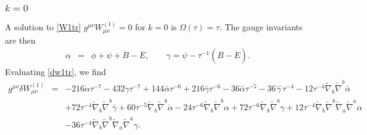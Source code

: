 \documentclass[10pt,letterpaper]{article}
\numberwithin{equation}{section}
\begin{document}
\subsubsection{$k=0$}
A solution to \eqref{W1tr} $g^{\mu\nu}W_{\mu\nu}^{(1)}=0$ for $k=0$ is $\Omega(\tau) = \tau$. The gauge invariants are then
\begin{eqnarray}
\alpha &=& \phi + \psi + \dot B - \ddot E,\qquad \gamma = \psi - \tau^{-1}(B-\dot E).
\end{eqnarray}
Evaluating \eqref{dw1tr}, we find
\begin{eqnarray}
g^{\mu\nu}\delta W_{\mu\nu}^{(1)}&=& -216 \dot{\alpha} \tau^{-7} - 432 \dot{\gamma} \tau^{-7} + 144 \overset{..}{\alpha} \tau^{-6} + 216 \overset{..}{\gamma} \tau^{-6} - 36 \overset{...}{\alpha} \tau^{-5} - 36 \overset{....}{\gamma} \tau^{-4} - 12 \tau^{-4} \tilde{\nabla}_{b}\tilde{\nabla}^{b}\overset{..}{\alpha} \nonumber \\ 
&& + 72 \tau^{-4} \tilde{\nabla}_{b}\tilde{\nabla}^{b}\overset{..}{\gamma} + 60 \tau^{-5} \tilde{\nabla}_{b}\tilde{\nabla}^{b}\dot{\alpha} - 24 \tau^{-6} \tilde{\nabla}_{b}\tilde{\nabla}^{b}\alpha + 72 \tau^{-6} \tilde{\nabla}_{b}\tilde{\nabla}^{b}\gamma + 12 \tau^{-4} \tilde{\nabla}_{b}\tilde{\nabla}^{b}\tilde{\nabla}_{a}\tilde{\nabla}^{a}\alpha \nonumber \\ 
&& - 36 \tau^{-4} \tilde{\nabla}_{b}\tilde{\nabla}^{b}\tilde{\nabla}_{a}\tilde{\nabla}^{a}\gamma.
\end{eqnarray}
\end{document}
